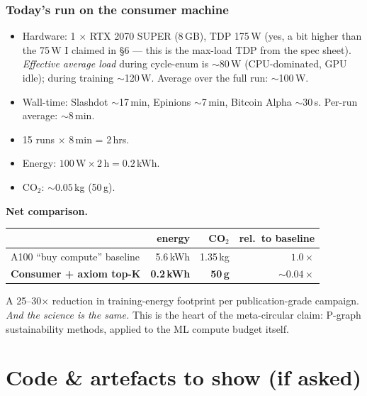 \documentclass[11pt,a4paper]{article}
\begin{document}
\subsubsection*{Today's run on the consumer machine}
\begin{itemize}
\item Hardware: 1 $\times$ RTX 2070 SUPER (8\,GB), TDP 175\,W (yes,
      a bit higher than the 75\,W I claimed in §6 --- this is the
      max-load TDP from the spec sheet). \emph{Effective average
      load} during cycle-enum is $\sim$80\,W (CPU-dominated, GPU
      idle); during training $\sim$120\,W. Average over the full
      run: $\sim$100\,W.
\item Wall-time: Slashdot $\sim$17\,min, Epinions $\sim$7\,min,
      Bitcoin Alpha $\sim$30\,s. Per-run average: $\sim$8\,min.
\item 15 runs $\times$ 8\,min = 2\,hrs.
\item Energy: $100 \,\text{W} \times 2 \,\text{h} = 0.2$\,kWh.
\item CO$_2$: $\sim 0.05$\,kg (50\,g).
\end{itemize}

\textbf{Net comparison.}
\begin{center}
\begin{tabular}{l r r r}
\toprule
                               & energy   & CO$_2$         & rel.\ to baseline \\
\midrule
A100 ``buy compute'' baseline  & 5.6\,kWh & 1.35\,kg       & $1.0\times$ \\
\textbf{Consumer + axiom top-K} & \textbf{0.2\,kWh} & \textbf{50\,g} & \textbf{$\sim 0.04 \times$} \\
\bottomrule
\end{tabular}
\end{center}

A 25--30$\times$ reduction in training-energy footprint per
publication-grade campaign. \emph{And the science is the same.}
This is the heart of the meta-circular claim: P-graph
sustainability methods, applied to the ML compute budget itself.

\section*{Code \& artefacts to show (if asked)}
\end{document}
